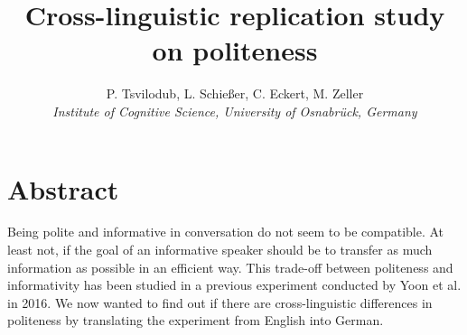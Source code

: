 \documentclass[a4paper,11pt]{article}
\title{Cross-linguistic replication study on politeness}
\author{P. Tsvilodub, L. Schießer, C. Eckert, M. Zeller 
\\ \textit{Institute of Cognitive Science, University of Osnabrück, Germany}}
\begin{document}
\maketitle

\section{Abstract}
Being polite and informative in conversation do not seem to be compatible. At least not, if the goal of an informative speaker should be to transfer as much information as possible in an efficient way. This trade-off between politeness and informativity has been studied in a previous experiment conducted by Yoon et al. \cite{yoon2016talking} in 2016. We now wanted to find out if there are cross-linguistic differences in politeness by translating the experiment from English into German.
\end{document}
